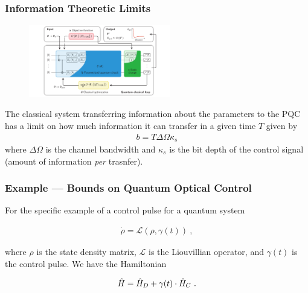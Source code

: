 
\begin{frame}
    \frametitle{Information Theoretic Limits}

    
    \begin{multicols}{2}
        \begin{figure}
            \includegraphics[width=0.55\textwidth]{figures/vqaarch.pdf}
        \end{figure}
        The classical system transferring information about the parameters to
        the PQC has a limit on how much information it can transfer in a given
        time \(T\) given by
        \begin{gather*}
            b = T\Delta\Omega\kappa_s
        \end{gather*}
        where \(\Delta\Omega\) is the channel bandwidth and \(\kappa_s\) is the
        bit depth of the control signal (amount of information \emph{per}
        trasnfer).
    \end{multicols}

\end{frame}

\begin{frame}
    \frametitle{Example --- Bounds on Quantum Optical Control}

    For the specific example of a control pulse for a quantum system
    \cite{lloyd2014information}

    \begin{gather*}
        \dot{\rho} = \mathcal{L}(\rho, \gamma(t))~,
    \end{gather*}

    where \(\rho\) is the state density matrix, \(\mathcal{L}\) is the
    Liouvillian operator, and \(\gamma(t)\) is the control pulse. We have the
    Hamiltonian

    \begin{gather*}
        \hat{H} = \hat{H}_D + \gamma(t)\cdot \hat{H}_C~.
    \end{gather*}

\end{frame}

